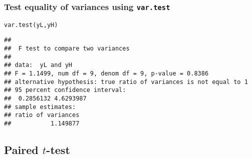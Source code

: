 \documentclass[color=usenames,dvipsnames]{beamer}\usepackage[]{graphicx}\usepackage[]{color}
\makeatletter
\newcommand{\hlstd}[1]{\textcolor[rgb]{0,0,0}{#1}}%
\newcommand{\hlkwd}[1]{\textcolor[rgb]{0.004,0.004,0.506}{#1}}%
\newenvironment{kframe}{%
 \def\at@end@of@kframe{}%
 \ifinner\ifhmode%
  \def\at@end@of@kframe{\end{minipage}}%
  \begin{minipage}{\columnwidth}%
 \fi\fi%
 \def\FrameCommand##1{\hskip\@totalleftmargin \hskip-\fboxsep
 \colorbox{shadecolor}{##1}\hskip-\fboxsep
     \hskip-\linewidth \hskip-\@totalleftmargin \hskip\columnwidth}%
 \MakeFramed {\advance\hsize-\width
   \@totalleftmargin\z@ \linewidth\hsize
   \@setminipage}}%
 {\par\unskip\endMakeFramed%
 \at@end@of@kframe}
\newenvironment{knitrout}{}{} %
\makeatother
\begin{document}
\begin{frame}[fragile]
  \frametitle{Test equality of variances using {\tt var.test}
  }
  \footnotesize
\begin{knitrout}
\color{fgcolor}\begin{kframe}
\begin{alltt}
\hlkwd{var.test}\hlstd{(yL, yH)}
\end{alltt}
\begin{verbatim}
## 
## 	F test to compare two variances
## 
## data:  yL and yH
## F = 1.1499, num df = 9, denom df = 9, p-value = 0.8386
## alternative hypothesis: true ratio of variances is not equal to 1
## 95 percent confidence interval:
##  0.2856132 4.6293987
## sample estimates:
## ratio of variances 
##           1.149877
\end{verbatim}
\end{kframe}
\end{knitrout}
\end{frame}


\begin{comment}
\begin{frame}
  \frametitle{$F$-distribution}

\end{frame}
\end{comment}



\subsection{Paired $t$-test}
\end{document}
